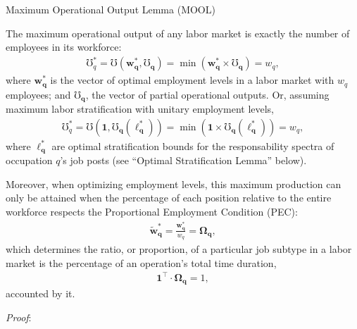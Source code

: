 \documentclass[hidelinks, nonatbib]{elsarticle}
\begin{document}
Maximum Operational Output Lemma (MOOL)

The maximum operational output of any labor market is exactly the number of employees in its workforce:
\begin{gather}
    \mho_{q}^{*}
    =
    \mho(
        \boldsymbol{w_{q}^{*}},
        \boldsymbol{\mho_q}
    ) = 
    \min(
        \boldsymbol{w_{q}^{*}}
        \times
        \boldsymbol{\mho_q}
    )
    = w_q
    ,
\end{gather}
where $\boldsymbol{w_{q}^{*}}$ is the vector of optimal employment levels in a labor market with $w_q$ employees; and $\boldsymbol{\mho_q}$, the vector of partial operational outputs. Or, assuming maximum labor stratification with unitary employment levels,
\begin{gather}
    \mho_{q}^{*}
    =
    \mho(
        \boldsymbol{1},
        \boldsymbol{\mho_q}(
            \boldsymbol{\ell_{q}^{*}}
        )
    )
    =
    \min(
        \boldsymbol{1}
        \times
        \boldsymbol{\mho_q}(
            \boldsymbol{\ell_{q}^{*}}
        )
    )
    = w_q
    ,
\end{gather}
where $\boldsymbol{\ell_{q}^{*}}$ are optimal stratification bounds for the responsability spectra of occupation $q$'s job posts (see ``Optimal Stratification Lemma'' below).

Moreover, when optimizing employment levels, this maximum production can only be attained when the percentage of each position relative to the entire workforce respects the Proportional Employment Condition (PEC):
\begin{gather}
    \boldsymbol{\tilde{w}_{q}^{*}}
    =
    \frac{
        \boldsymbol{w_{q}^{*}}
    }{
        w_q
    }
    =
    \boldsymbol{\Omega_{q}}
    ,
\end{gather}
which determines the ratio, or proportion, of a particular job subtype in a labor market is the percentage of an operation's total time duration,
\begin{gather}
    \boldsymbol{1} ^ {\top}
    \cdot
    \boldsymbol{\Omega_{q}}
    = 1
    ,
\end{gather}
accounted by it.

\textit{Proof}:
\end{document}
